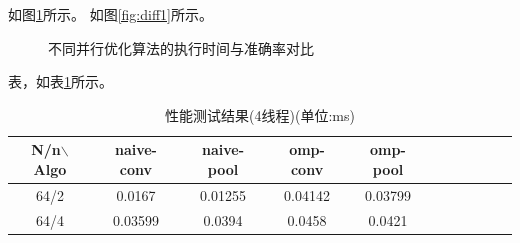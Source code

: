 \documentclass[a4paper]{article}
\begin{document}
如图\ref{fig:diff}所示。
如图\ref{fig:diff1}所示。
\begin{figure}[htbp]
  \centering
  \centering
  \caption{不同并行优化算法的执行时间与准确率对比}
  \label{fig:diff}
\end{figure}


表，如表\ref{table:t1}所示。
\begin{table}[!htbp]
  \centering
  \begin{tabular}{ccccccccccc}
    \toprule
    N/n$\backslash$Algo & naive-conv & naive-pool & omp-conv & omp-pool \\
    \midrule
    64/2                & 0.0167     & 0.01255    & 0.04142  & 0.03799  \\
    64/4                & 0.03599    & 0.0394     & 0.0458   & 0.0421   \\
    \bottomrule
  \end{tabular}
  \caption{性能测试结果(4线程)(单位:ms)}
  \label{table:t1}
\end{table}
\end{document}
